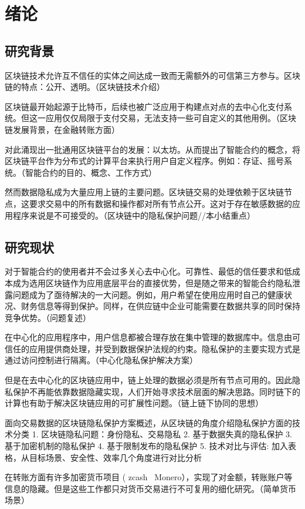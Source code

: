 \chapter{绪论}

\section{研究背景}

区块链技术允许互不信任的实体之间达成一致而无需额外的可信第三方参与。区块链的特点：公开、透明。（区块链技术介绍）

区块链最开始起源于比特币，后续也被广泛应用于构建点对点的去中心化支付系统。但这一应用仅仅局限于支付交易，无法支持一些可自定义的其他用例。（区块链发展背景，在金融转账方面）

对此涌现出一批通用区块链平台的发展：以太坊。从而提出了智能合约的概念，将区块链平台作为分布式的计算平台来执行用户自定义程序。例如：存证、摇号系统。（智能合约的目的、概念、工作方式）

然而数据隐私成为大量应用上链的主要问题。区块链交易的处理依赖于区块链节点，这要求交易中的所有数据和操作都对所有节点公开。这对于存在敏感数据的应用程序来说是不可接受的。（区块链中的隐私保护问题//本小结重点）
\section{研究现状}

对于智能合约的使用者并不会过多关心去中心化。可靠性、最低的信任要求和低成本成为选用区块链作为应用底层平台的直接优势，但是随之带来的智能合约隐私泄露问题成为了亟待解决的一大问题。例如，用户希望在使用应用时自己的健康状况、财务信息等得到保护。同样，在供应链中企业可能需要在数据共享的同时保持竞争优势。（问题复述）

在中心化的应用程序中，用户信息都被合理存放在集中管理的数据库中。信息由可信任的应用提供商处理，并受到数据保护法规的约束。隐私保护的主要实现方式是通过访问控制进行隔离。（中心化隐私保护解决方案）

但是在去中心化的区块链应用中，链上处理的数据必须是所有节点可用的。因此隐私保护不再能依靠数据隐藏实现，人们开始寻求技术层面的解决思路。同时链下的计算也有助于解决区块链应用的可扩展性问题。（链上链下协同的思想）

面向交易数据的区块链隐私保护方案概述，从区块链的角度介绍隐私保护方面的技术分类
1. 区块链隐私问题：身份隐私、交易隐私
2. 基于数据失真的隐私保护
3. 基于加密机制的隐私保护
4. 基于限制发布的隐私保护
5. 技术对比与评估: 加入表格，从目标场景、安全性、效率几个角度进行对比分析

在转账方面有许多加密货币项目 ( zcash \ Monero），实现了对金额，转账账户等信息的隐藏。但是这些工作都只对货币交易进行不可复用的细化研究。（简单货币场景）

